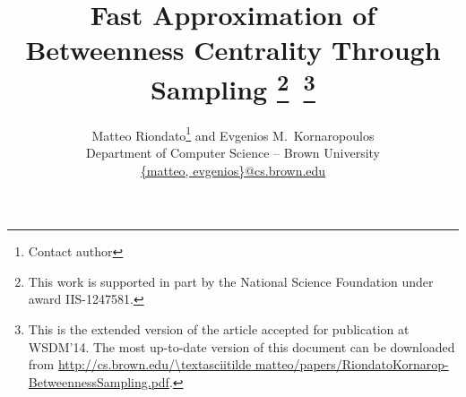\documentclass[10pt]{article}
\theoremstyle{definition}
\begin{document}
\title{Fast Approximation of Betweenness Centrality Through Sampling
\thanks{This work is supported in part by the National Science Foundation under
award IIS-1247581.}\ \footnote{This is the extended version of the article
accepted for publication at WSDM'14. The most up-to-date version of this
document can be downloaded from
\protect\url{http://cs.brown.edu/\textasciitilde
matteo/papers/RiondatoKornarop-BetweennessSampling.pdf}.}}
\author{Matteo Riondato\footnote{Contact author} and Evgenios M.~Kornaropoulos\\
Department of Computer Science -- Brown University \\
\url{{matteo, evgenios}@cs.brown.edu}}
\maketitle













\end{document}
